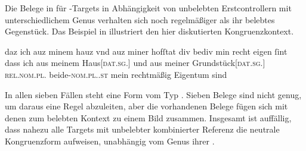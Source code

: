
Die Belege in  für -Targets in
Abhängigkeit von unbelebten Erstcontrollern mit
unterschiedlichem Genus verhalten sich noch regelmäßiger als ihr belebtes
Gegenstück. Das Beispiel in  illustriert den hier
diskutierten Kongruenzkontext.

\begin{exe}
\ex \label{ex:cao_diffgend_inan}
		\gll daz ich auz minem hauz vnd auz miner hofſtat
				div bediv min recht eigen ſint \textelp{} \\
			dass ich aus meinem Haus[\textsc{dat.sg.\NeutI}] und aus meiner
				Grundstück[\textsc{dat.sg.\FemI}] \textsc{rel.nom.pl.\NeutI}
				beide-\textsc{nom.pl.\NeutI.st} mein rechtmäßig Eigentum sind \\
		\trans {}
			\parencites(Nr.~1282, Regensburg, 1290)[526,37--38]{cao2}

\end{exe}

In allen sieben Fällen steht eine Form vom Typ . Sieben Belege
sind nicht genug, um daraus eine Regel abzuleiten, aber die vorhandenen Belege
fügen sich mit denen zum belebten Kontext zu einem Bild zusammen. Insgesamt ist
auffällig, dass nahezu alle Targets mit unbelebter kombinierter Referenz die
neutrale Kongruenzform  aufweisen, unabhängig vom Genus ihrer
.


